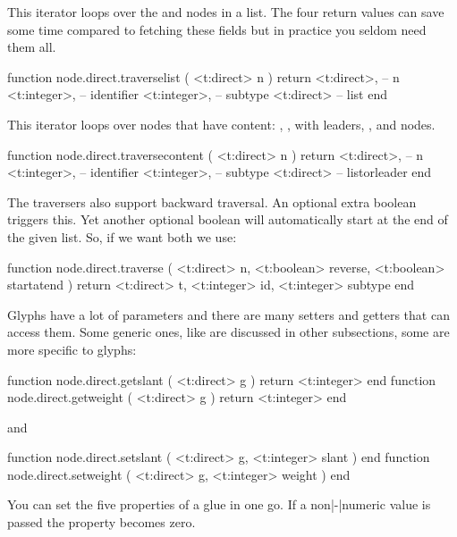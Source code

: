 This iterator loops over the  and  nodes in a list. The
four return values can save some time compared to fetching these fields but in
practice you seldom need them all.

\starttyping[option=LUA]
function node.direct.traverselist ( <t:direct> n )
    return
        <t:direct>,  -- n
        <t:integer>, -- identifier
        <t:integer>, -- subtype
        <t:direct>   -- list
end
\stoptyping

This iterator loops over nodes that have content: , ,
 with leaders, ,  and  nodes.

\starttyping[option=LUA]
function node.direct.traversecontent ( <t:direct> n )
    return
        <t:direct>,  -- n
        <t:integer>, -- identifier
        <t:integer>, -- subtype
        <t:direct>   -- listorleader
end
\stoptyping

The traversers also support backward traversal. An optional extra boolean triggers
this. Yet another optional boolean will automatically start at the end of the
given list. So, if we want both we use:

\starttyping[option=LUA]
function node.direct.traverse (
    <t:direct>  n,
    <t:boolean> reverse,
    <t:boolean> startatend
)
    return
        <t:direct>  t,
        <t:integer> id,
        <t:integer> subtype
end
\stoptyping

\stopsubsection

\startsubsection[title={Glyphs}]

Glyphs have a lot of parameters and there are many setters and getters that
can access them. Some generic ones, like  are discussed
in other subsections, some are more specific to glyphs:

\starttyping[option=LUA]
function node.direct.getslant  ( <t:direct> g ) return <t:integer> end
function node.direct.getweight ( <t:direct> g ) return <t:integer> end
\stoptyping

and

\starttyping[option=LUA]
function node.direct.setslant  ( <t:direct> g, <t:integer> slant  ) end
function node.direct.setweight ( <t:direct> g, <t:integer> weight ) end
\stoptyping

\stopsubsection

\startsubsection[title={Glue}]

You can set the five properties of a glue in one go. If a non|-|numeric value is
passed the property becomes zero.

